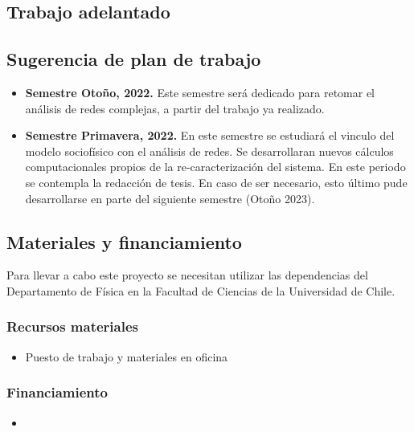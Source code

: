 \documentclass{proyectotesis}
\begin{document}
\subsection{Trabajo adelantado}

\subsection{Sugerencia de plan de trabajo}
\begin{itemize}
\item \textbf{Semestre Otoño, 2022.} Este semestre será dedicado para retomar el análisis de redes complejas, a partir del trabajo ya realizado.  

\item \textbf{Semestre Primavera, 2022.} En este semestre se estudiará el vinculo del modelo sociofísico con el análisis de redes. Se desarrollaran nuevos cálculos computacionales propios de la re-caracterización del sistema. En este periodo se contempla la redacción de tesis. En caso de ser necesario, esto último pude desarrollarse en parte del siguiente semestre (Otoño 2023). 
\end{itemize}

\subsection{Materiales y financiamiento}

Para llevar a cabo este proyecto se necesitan utilizar las dependencias del Departamento de Física en la Facultad de Ciencias de la Universidad de Chile. %

\subsubsection*{Recursos materiales}

\begin{itemize}
\item Puesto de trabajo y materiales en oficina

\nocite{*}
\end{itemize}
\subsubsection*{Financiamiento}
\begin{itemize}
\item
\end{itemize}

%
%
\end{document}
